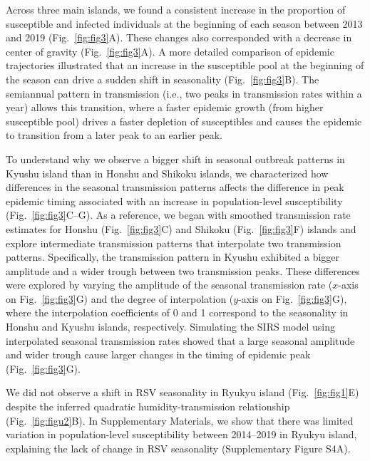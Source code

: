 \documentclass[12pt]{article}
\newcommand{\fref}[1]{Fig.~\ref{fig:#1}}
\begin{document}
Across three main islands, we found a consistent increase in the proportion of susceptible and infected individuals at the beginning of each season between 2013 and 2019 (\fref{fig3}A).
These changes also corresponded with a decrease in center of gravity (\fref{fig3}A).
A more detailed comparison of epidemic trajectories illustrated that an increase in the susceptible pool at the beginning of the season can drive a sudden shift in seasonality (\fref{fig3}B).
The semiannual pattern in transmission (i.e., two peaks in transmission rates within a year) allows this transition, where a faster epidemic growth (from higher susceptible pool) drives a faster depletion of susceptibles and causes the epidemic to transition from a later peak to an earlier peak.

To understand why we observe a bigger shift in seasonal outbreak patterns in Kyushu island than in Honshu and Shikoku islands, we characterized how differences in the seasonal transmission patterns affects the difference in peak epidemic timing associated with an increase in population-level susceptibility (\fref{fig3}C--G).
As a reference, we began with smoothed transmission rate estimates for Honshu (\fref{fig3}C) and Shikoku (\fref{fig3}F) islands and explore intermediate transmission patterns that interpolate two transmission patterns.
Specifically, the transmission pattern in Kyushu exhibited a bigger amplitude and a wider trough between two transmission peaks.
These differences were explored by varying the amplitude of the seasonal transmission rate ($x$-axis on \fref{fig3}G) and the degree of interpolation ($y$-axis on \fref{fig3}G), where the interpolation coefficients of 0 and 1 correspond to the seasonality in Honshu and Kyushu islands, respectively.
Simulating the SIRS model using interpolated seasonal transmission rates showed that a large seasonal amplitude and wider trough cause larger changes in the timing of epidemic peak (\fref{fig3}G). 

We did not observe a shift in RSV seasonality in Ryukyu island (\fref{fig1}E) despite the inferred quadratic humidity-transmission relationship (\fref{figu2}B).
In Supplementary Materials, we show that there was limited variation in population-level susceptibility between 2014--2019 in Ryukyu island, explaining the lack of change in RSV seasonality (Supplementary Figure S4A).
\end{document}
